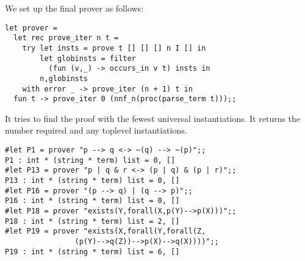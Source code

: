 \begin{slide*}


We set up the final prover as follows:

\begin{black}\begin{footnotesize}\begin{verbatim}
let prover =
  let rec prove_iter n t =
    try let insts = prove t [] [] [] n I [] in
        let globinsts = filter
          (fun (v,_) -> occurs_in v t) insts in
        n,globinsts
    with error _ -> prove_iter (n + 1) t in
  fun t -> prove_iter 0 (nnf_n(proc(parse_term t)));;
\end{verbatim}\end{footnotesize}\end{black}

It tries to find the proof with the fewest universal instantiations.
It returns the number required and any toplevel instantiations.

\begin{black}\begin{footnotesize}\begin{verbatim}
#let P1 = prover "p --> q <-> ~(q) --> ~(p)";;
P1 : int * (string * term) list = 0, []
#let P13 = prover "p | q & r <-> (p | q) & (p | r)";;
P13 : int * (string * term) list = 0, []
#let P16 = prover "(p --> q) | (q --> p)";;
P16 : int * (string * term) list = 0, []
#let P18 = prover "exists(Y,forall(X,p(Y)-->p(X)))";;
P18 : int * (string * term) list = 2, []
#let P19 = prover "exists(X,forall(Y,forall(Z,
                (p(Y)-->q(Z))-->p(X)-->q(X))))";;
P19 : int * (string * term) list = 6, []
\end{verbatim}\end{footnotesize}\end{black}

\end{slide*}




